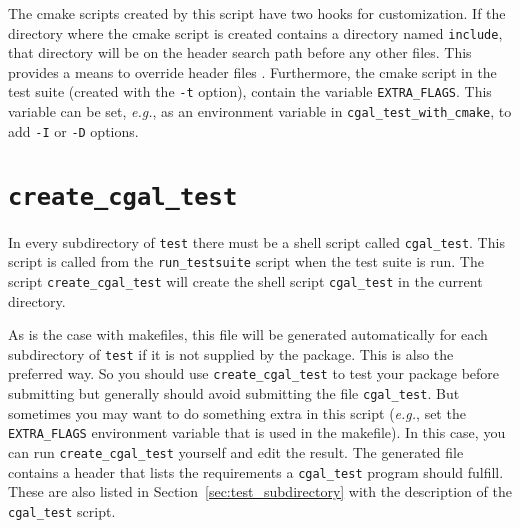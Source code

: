 The cmake scripts created by this script have two hooks for customization.
If the directory
where the cmake script is created contains a directory named {\tt include},%
that
directory will be on the header search path before any other files. This
provides a means to override header files%
.
Furthermore, the cmake script in the
test suite (created with the {\tt -t} option), contain the variable
{\tt EXTRA\_FLAGS}.%
This variable can be set, {\em e.g.}, as an environment variable in
{\tt cgal\_test\_with\_cmake}, to add {\tt -I} or {\tt -D} options.

\section{{\tt create\_cgal\_test}}
\label{sec:create_cgal_test}

In every subdirectory of {\tt test} there must be a shell script called
{\tt cgal\_test}. This script is called from the {\tt run\_testsuite}%
script when the test suite is run. The script
{{\tt create\_cgal\_test}}
will create the shell script {\tt cgal\_test} in the current directory.

As is the case with makefiles, this file will be generated automatically for
each subdirectory of {\tt test} if
it is not supplied by the package. This is also the preferred way.
So you should use {\tt create\_cgal\_test} to test your package before
submitting but generally should avoid submitting the file {\tt cgal\_test}.
But sometimes you may want to do something extra in this script ({\em e.g.}, set
the {\tt EXTRA\_FLAGS}
environment variable that is used in the makefile).
In this case, you can run {\tt create\_cgal\_test} yourself and edit the result.
The generated file contains a header that lists the requirements a
{\tt cgal\_test} program should fulfill. These are also listed in
Section~\ref{sec:test_subdirectory} with the description of the
{\tt cgal\_test} script.

